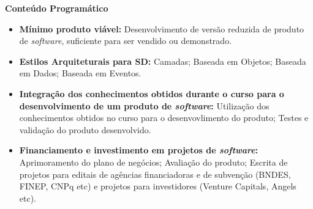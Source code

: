 
\begin{snugshade}\begin{center}\textbf{
    Conteúdo Programático
}\end{center}\end{snugshade}

\begin{itemize}

 \item \textbf{M\'inimo produto vi\'avel:} Desenvolvimento de vers\~ao reduzida de produto de \textit{software}, suficiente para ser vendido ou demonstrado.

 \item \textbf{Estilos Arquiteturais para SD:} Camadas; Baseada em Objetos; Baseada em Dados; Baseada em Eventos.

 \item \textbf{Integra\c{c}\~ao dos conhecimentos obtidos durante o curso para o desenvolvimento de um produto de \textit{software}:} Utiliza\c{c}\~ao dos conhecimentos obtidos no curso para o desenvovlimento do produto; Testes e valida\c{c}\~ao do produto desenvolvido.

 \item \textbf{Financiamento e investimento em projetos de \textit{software}:} Aprimoramento do plano de neg\'ocios; Avalia\c{c}\~ao do produto; Escrita de projetos para editais de agências financiadoras e de subvenção (BNDES, FINEP, CNPq etc) e projetos para investidores (Venture Capitals, Angels etc).


\end{itemize}





